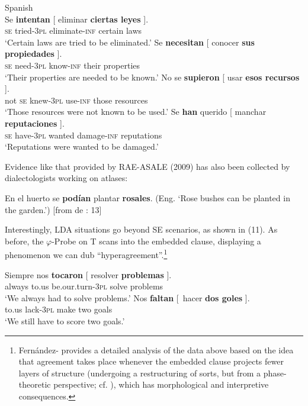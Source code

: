 \documentclass[output=paper]{langsci/langscibook}
\begin{document}
\ea%
    Spanish\label{ex:gallego:9}\\
    \ea
    \gll Se  \textbf{intentan}  [ eliminar        \textbf{ciertas  leyes} ].        \\
         \textsc{se} tried\textsc{{}-3pl}  eliminate-\textsc{inf}  certain   laws\\
    \glt ‘Certain laws are tried to be eliminated.’  
    \ex
    \gll Se  \textbf{necesitan}  [ conocer     \textbf{sus    propiedades} ].         \\
            \textsc{se}  need\textsc{{}-3pl}   know-\textsc{inf}   their  properties\\
    \glt    ‘Their properties are needed to be known.’
    \ex
    \gll No se   \textbf{supieron}  [ usar        \textbf{esos    recursos} ].        \\
            not \textsc{se} knew\textsc{{}-3pl}    use-\textsc{inf}   those   resources\\
    \glt    ‘Those resources were not known to be used.’
    \ex
    \gll  Se   \textbf{han}           querido [ manchar        \textbf{reputaciones} ].     \\
            \textsc{se} have\textsc{{}-3pl}  wanted    damage-\textsc{inf}   reputations\\
    \glt     ‘Reputations were wanted to be damaged.’
    \z
\z

Evidence like that provided by RAE-ASALE (2009) has also been collected by dialectologists working on atlases:

\ea%
En el huerto se \textbf{podían} plantar \textbf{rosales}.  (Eng. ‘Rose bushes can be planted in the garden.’) [from de \citealt{Benito2010}: 13] \\
\z

Interestingly, LDA situations go beyond SE scenarios, as shown in (11). As before, the $\varphi $-Probe on T scans into the embedded clause, displaying a phenomenon we can dub “hyperagreement”.\footnote{Fernández-\citet{Serrano2016} provides a detailed analysis of the data above based on the idea that agreement takes place whenever the embedded clause projects fewer layers of structure (undergoing a restructuring of sorts, but from a phase-theoretic perspective; cf. \citealt{Gallego2009}), which has morphological and interpretive consequences.} 

\ea%
    \label{ex:gallego:11}
    \ea
    \gll Siempre   nos    \textbf{tocaron}              [ resolver  \textbf{problemas} ].\\
         always    to.us  be.our.turn-\textsc{3pl}  solve       problems\\
    \glt ‘We always had to solve problems.’
    \ex
    \gll Nos   \textbf{faltan}    [~hacer  \textbf{dos  goles} ].\\
         to.us  lack-\textsc{3pl}   make two goals\\
    \glt ‘We still have to score two goals.’
    \z
\z    
\end{document}
